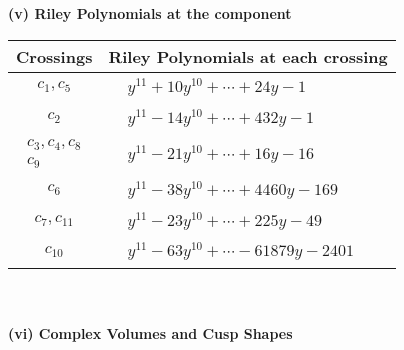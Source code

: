\documentclass[1p]{elsarticle_modified}
\theoremstyle{definition}
\begin{document}
\newpage\renewcommand{\arraystretch}{1}
\flushleft \textbf{(v) Riley Polynomials at the component}\newline \\
\begin{tabular}{m{50pt}|m{274pt}}
Crossings & \hspace{64pt}Riley Polynomials at each crossing \\
\hline $$\begin{aligned}c_{1},c_{5}\end{aligned}$$&$\begin{aligned}
&y^{11}+10 y^{10}+\cdots+24 y-1
\end{aligned}$\\
\hline $$\begin{aligned}c_{2}\end{aligned}$$&$\begin{aligned}
&y^{11}-14 y^{10}+\cdots+432 y-1
\end{aligned}$\\
\hline $$\begin{aligned}c_{3},c_{4},c_{8}\\c_{9}\end{aligned}$$&$\begin{aligned}
&y^{11}-21 y^{10}+\cdots+16 y-16
\end{aligned}$\\
\hline $$\begin{aligned}c_{6}\end{aligned}$$&$\begin{aligned}
&y^{11}-38 y^{10}+\cdots+4460 y-169
\end{aligned}$\\
\hline $$\begin{aligned}c_{7},c_{11}\end{aligned}$$&$\begin{aligned}
&y^{11}-23 y^{10}+\cdots+225 y-49
\end{aligned}$\\
\hline $$\begin{aligned}c_{10}\end{aligned}$$&$\begin{aligned}
&y^{11}-63 y^{10}+\cdots-61879 y-2401
\end{aligned}$\\
\hline
\end{tabular}\\~\\
\newpage\flushleft \textbf{(vi) Complex Volumes and Cusp Shapes}
\end{document}
